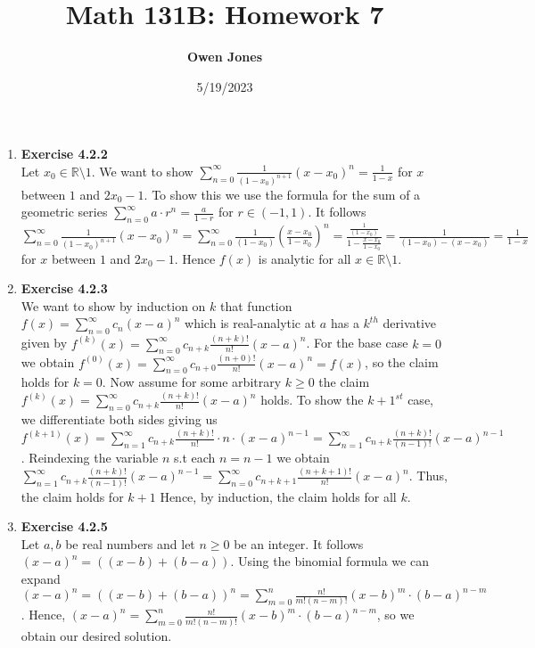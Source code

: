 \documentclass[10pt]{article}
\title{\bf Math 131B: Homework 7}
\date{5/19/2023}
\author{\bf Owen Jones}
\begin{document}
\maketitle
\begin{enumerate}[label=Problem \arabic*.]
    \item \textbf{Exercise 4.2.2}\\
Let $x_0\in\mathbb{R}\setminus1$. We want to show $\displaystyle\sum_{n=0}^{\infty}\frac{1}{(1-x_0)^{n+1}}{(x-x_0)}^n=\frac{1}{1-x}$ for $x$ between $1$ and $2x_0-1$.
To show this we use the formula for the sum of a geometric series $\displaystyle\sum_{n=0}^{\infty}a\cdot r^n=\frac{a}{1-r}$ for $r\in(-1,1)$.
It follows $\displaystyle\sum_{n=0}^{\infty}\frac{1}{(1-x_0)^{n+1}}(x-x_0)^n=\displaystyle\sum_{n=0}^{\infty}\frac{1}{(1-x_0)}(\frac{x-x_0}{1-x_0})^n=\frac{\frac{1}{(1-x_0)}}{1-\frac{x-x_0}{1-x_0}}=\frac{1}{(1-x_0)-(x-x_0)}=\frac{1}{1-x}$ for $x$ between $1$ and $2x_0-1$.
Hence $f(x)$ is analytic for all $x\in\mathbb{R}\setminus1$.
    \item \textbf{Exercise 4.2.3}\\
We want to show by induction on $k$ that function $f(x)=\displaystyle\sum_{n=0}^{\infty}c_n(x-a)^n$ which is real-analytic at $a$ has a $k^{th}$ derivative given by $f^{(k)}(x)=\displaystyle\sum_{n=0}^{\infty}c_{n+k}\frac{(n+k)!}{n!}(x-a)^n$.
For the base case $k=0$ we obtain $f^{(0)}(x)=\displaystyle\sum_{n=0}^{\infty}c_{n+0}\frac{(n+0)!}{n!}(x-a)^n=f(x)$, so the claim holds for $k=0$.
Now assume for some arbitrary $k\ge0$ the claim $f^{(k)}(x)=\displaystyle\sum_{n=0}^{\infty}c_{n+k}\frac{(n+k)!}{n!}(x-a)^n$ holds.
To show the $k+1^{st}$ case, we differentiate both sides giving us $f^{(k+1)}(x)=\displaystyle\sum_{n=1}^{\infty}c_{n+k}\frac{(n+k)!}{n!}\cdot n\cdot(x-a)^{n-1}=\sum_{n=1}^{\infty}c_{n+k}\frac{(n+k)!}{(n-1)!}(x-a)^{n-1}$.
Reindexing the variable $n$ s.t each $n=n-1$ we obtain $\displaystyle\sum_{n=1}^{\infty}c_{n+k}\frac{(n+k)!}{(n-1)!}(x-a)^{n-1}=\sum_{n=0}^{\infty}c_{n+k+1}\frac{(n+k+1)!}{n!}(x-a)^{n}$.
Thus, the claim holds for $k+1$
Hence, by induction, the claim holds for all $k$.
    \item \textbf{Exercise 4.2.5}\\
Let $a,b$ be real numbers and let $n\ge0$ be an integer.
It follows $(x-a)^n=((x-b)+(b-a))$.
Using the binomial formula we can expand $\displaystyle (x-a)^n=((x-b)+(b-a))^n=\sum_{m=0}^{n}\frac{n!}{m!(n-m)!}(x-b)^m\cdot (b-a)^{n-m}$.
Hence, $\displaystyle (x-a)^n=\sum_{m=0}^{n}\frac{n!}{m!(n-m)!}(x-b)^m\cdot {(b-a)}^{n-m}$, so we obtain our desired solution.\\

\end{enumerate}
\end{document}
